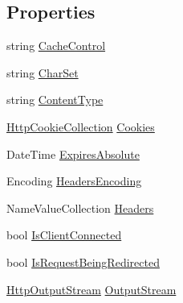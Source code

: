 \subsection*{Properties}
\begin{DoxyCompactItemize}
\item 
string \hyperlink{class_p_http_1_1_http_response_a03fac2b45dd30f39d3dc8a54b791ca8e}{Cache\+Control}
\item 
string \hyperlink{class_p_http_1_1_http_response_abe34cf26dbacdf3b05889bab4ce450b9}{Char\+Set}
\item 
string \hyperlink{class_p_http_1_1_http_response_a8c9dc1f065002a1a1a802b7f711c309b}{Content\+Type}
\item 
\hyperlink{class_p_http_1_1_http_cookie_collection}{Http\+Cookie\+Collection} \hyperlink{class_p_http_1_1_http_response_a8dbfb0838084e2a340bb645458e80340}{Cookies}
\item 
Date\+Time \hyperlink{class_p_http_1_1_http_response_a66d1928b9ddfb7fde134b49526f2f7df}{Expires\+Absolute}
\item 
Encoding \hyperlink{class_p_http_1_1_http_response_aa482de609c9a20bfc9807a7d20693a77}{Headers\+Encoding}
\item 
Name\+Value\+Collection \hyperlink{class_p_http_1_1_http_response_a0dd2eb88f26f3d2e076a89daf2d70b01}{Headers}
\item 
bool \hyperlink{class_p_http_1_1_http_response_afc2755555012d91d8e1421cc1268af7c}{Is\+Client\+Connected}
\item 
bool \hyperlink{class_p_http_1_1_http_response_a57384d805c05f6d7152cdddc96ba2de3}{Is\+Request\+Being\+Redirected}
\item 
\hyperlink{class_p_http_1_1_http_output_stream}{Http\+Output\+Stream} \hyperlink{class_p_http_1_1_http_response_ab2d95593e6189ead61f2bba2d3e5fd19}{Output\+Stream}

\end{DoxyCompactItemize}
